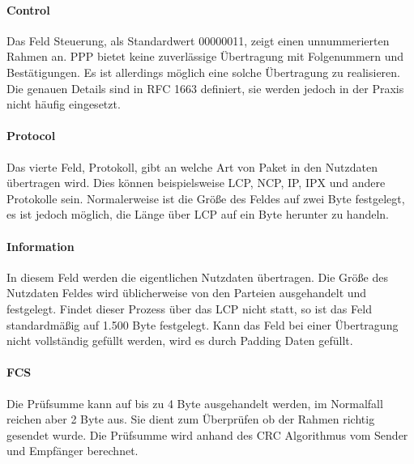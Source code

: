 \documentclass[12pt, a4paper, ngerman]{article}
\begin{document}
\paragraph{Control}

Das Feld Steuerung, als Standardwert 00000011, zeigt einen unnummerierten Rahmen an. PPP bietet keine zuverlässige Übertragung mit Folgenummern und Bestätigungen. Es ist allerdings möglich eine solche 
Über\-tra\-gung zu realisieren. Die genauen Details sind in RFC 1663 definiert, sie werden jedoch in der Praxis nicht häufig eingesetzt.


\paragraph{Protocol}

Das vierte Feld, Protokoll, gibt an welche Art von Paket in den Nutzdaten übertragen wird. Dies können beispielsweise LCP, NCP, IP, IPX und andere Protokolle sein. Normalerweise ist die Größe des Feldes auf zwei Byte festgelegt, es ist jedoch möglich, die Länge über LCP auf ein Byte herunter zu handeln.


\paragraph{Information}

In diesem Feld werden die eigentlichen Nutzdaten übertragen. Die Größe des Nutzdaten Feldes wird üblicherweise von den Parteien ausgehandelt und festgelegt. Findet dieser Prozess über das LCP nicht statt, so ist das Feld standardmäßig auf 1.500 Byte festgelegt.
Kann das Feld bei einer Übertragung nicht vollständig gefüllt werden, wird es durch Padding Daten gefüllt.

\paragraph{FCS}

Die Prüfsumme kann auf bis zu 4 Byte ausgehandelt werden, im Normalfall reichen aber 2 Byte aus. Sie dient zum Überprüfen ob der Rahmen richtig gesendet wurde. Die Prüfsumme wird anhand des CRC Algorithmus vom Sender und Empfänger berechnet. 
\end{document}
